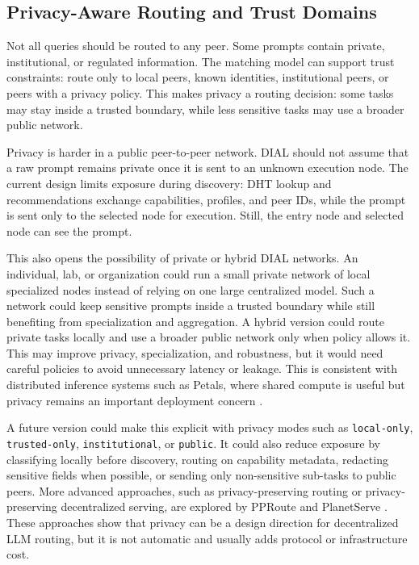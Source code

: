 \subsection{Privacy-Aware Routing and Trust Domains}

Not all queries should be routed to any peer. Some prompts contain private,
institutional, or regulated information. The matching model can support trust
constraints: route only to local peers, known identities, institutional peers,
or peers with a privacy policy. This makes privacy a routing decision: some
tasks may stay inside a trusted boundary, while less sensitive tasks may use a
broader public network.

Privacy is harder in a public peer-to-peer network. DIAL should not assume that
a raw prompt remains private once it is sent to an unknown execution node. The
current design limits exposure during discovery: DHT lookup and recommendations
exchange capabilities, profiles, and peer IDs, while the prompt is sent only to
the selected node for execution. Still, the entry node and selected node can see
the prompt.

This also opens the possibility of private or hybrid DIAL networks. An
individual, lab, or organization could run a small private network of local
specialized nodes instead of relying on one large centralized model. Such a
network could keep sensitive prompts inside a trusted boundary while still
benefiting from specialization and aggregation. A hybrid version could route
private tasks locally and use a broader public network only when policy allows
it. This may improve privacy, specialization, and robustness, but it would need
careful policies to avoid unnecessary latency or leakage. This is consistent
with distributed inference systems such as Petals, where shared compute is
useful but privacy remains an important deployment concern
\citep{borzunov2023petals}.

A future version could make this explicit with privacy modes such as
\texttt{local-only}, \texttt{trusted-only}, \texttt{institutional}, or
\texttt{public}. It could also reduce exposure by classifying locally before
discovery, routing on capability metadata, redacting sensitive fields when
possible, or sending only non-sensitive sub-tasks to public peers. More advanced
approaches, such as privacy-preserving routing or privacy-preserving
decentralized serving, are explored by PPRoute and PlanetServe
\citep{wu2026privacyrouting,fang2026planetserve}. These approaches show that
privacy can be a design direction for decentralized LLM routing, but it is not
automatic and usually adds protocol or infrastructure cost.

